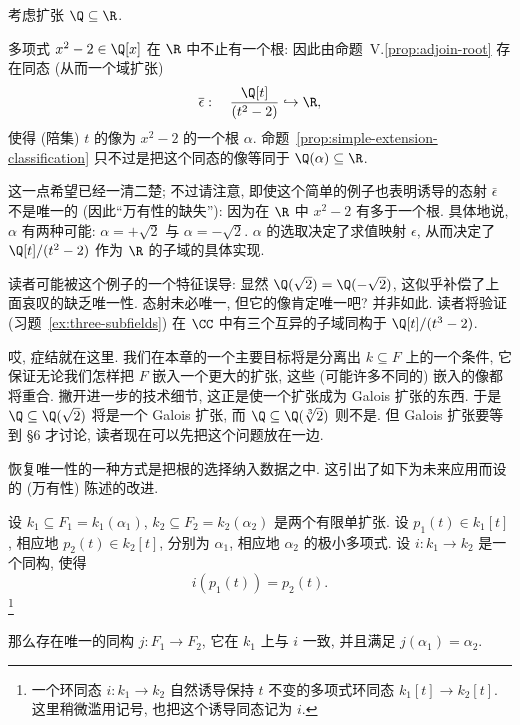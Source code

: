 \begin{example}\label{ex:sqrt2-extension}
考虑扩张 $\Q\subseteq\R$.

多项式 $x^2-2\in\Q[x]$ 在 $\R$ 中不止有一个根: 因此由命题~V.\ref{prop:adjoin-root} 存在同态 (从而一个域扩张)
\[
\overline{\epsilon}:\quad \frac{\Q[t]}{(t^2-2)}\hookrightarrow\R,
\]
使得 (陪集) $t$ 的像为 $x^2-2$ 的一个根 $\alpha$. 命题~\ref{prop:simple-extension-classification} 只不过是把这个同态的像等同于 $\Q(\alpha)\subseteq\R$.

这一点希望已经一清二楚; 不过请注意, 即使这个简单的例子也表明诱导的态射 $\bar{\epsilon}$ 不是唯一的 (因此``万有性的缺失''): 因为在 $\R$ 中 $x^2-2$ 有多于一个根. 具体地说, $\alpha$ 有两种可能: $\alpha=+\sqrt{2}$ 与 $\alpha=-\sqrt{2}$. $\alpha$ 的选取决定了求值映射 $\epsilon$, 从而决定了 $\Q[t]/(t^2-2)$ 作为 $\R$ 的子域的具体实现.

读者可能被这个例子的一个特征误导: 显然 $\Q(\sqrt{2})=\Q(-\sqrt{2})$, 这似乎补偿了上面哀叹的缺乏唯一性. 态射未必唯一, 但它的像肯定唯一吧? 并非如此. 读者将验证 (习题~\ref{ex:three-subfields}) 在 $\CC$ 中有三个互异的子域同构于 $\Q[t]/(t^3-2)$.

哎, 症结就在这里. 我们在本章的一个主要目标将是分离出 $k\subseteq F$ 上的一个条件, 它保证无论我们怎样把 $F$ 嵌入一个更大的扩张, 这些 (可能许多不同的) 嵌入的像都将重合. 撇开进一步的技术细节, 这正是使一个扩张成为 Galois 扩张的东西. 于是 $\Q\subseteq\Q(\sqrt{2})$ 将是一个 Galois 扩张, 而 $\Q\subseteq\Q(\sqrt[3]{2})$ 则不是. 但 Galois 扩张要等到 §6 才讨论, 读者现在可以先把这个问题放在一边.
\end{example}

恢复唯一性的一种方式是把根的选择纳入数据之中. 这引出了如下为未来应用而设的 (万有性) 陈述的改进.

\begin{proposition}\label{prop:simple-ext-iso-lift}
设 $k_1\subseteq F_1=k_1(\alpha_1)$, $k_2\subseteq F_2=k_2(\alpha_2)$ 是两个有限单扩张. 设 $p_1(t)\in k_1[t]$, 相应地 $p_2(t)\in k_2[t]$, 分别为 $\alpha_1$, 相应地 $\alpha_2$ 的极小多项式. 设 $i:k_1\to k_2$ 是一个同构, 使得
\[
i(p_1(t))=p_2(t).
\]\footnote{一个环同态 $i:k_1\to k_2$ 自然诱导保持 $t$ 不变的多项式环同态 $k_1[t]\to k_2[t]$. 这里稍微滥用记号, 也把这个诱导同态记为 $i$.}

那么存在唯一的同构 $j:F_1\to F_2$, 它在 $k_1$ 上与 $i$ 一致, 并且满足 $j(\alpha_1)=\alpha_2$.
\end{proposition}

